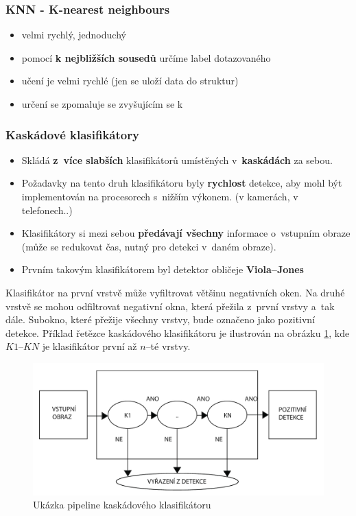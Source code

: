 \subsubsection{KNN - K-nearest neighbours}
\begin{itemize}
\item velmi rychlý, jednoduchý
\item pomocí \textbf{k nejbližších sousedů} určíme label dotazovaného 
\item učení je velmi rychlé (jen se uloží data do struktur)
\item určení se zpomaluje se zvyšujícím se k
\end{itemize}

\subsubsection{Kaskádové klasifikátory} %
\begin{itemize}
  \item Skládá \textbf{z~více slabších} klasifikátorů umístěných v~\textbf{kaskádách} za sebou.
  \item Požadavky na tento druh klasifikátoru byly \textbf{rychlost} detekce, aby mohl být implementován na procesorech s~nižším výkonem. (v kamerách, v telefonech..)
  \item Klasifikátory si mezi sebou \textbf{předávají všechny} informace o~vstupním obraze (může se redukovat čas, nutný pro detekci v~daném obraze).
  \item Prvním takovým klasifikátorem byl detektor obličeje \textbf{Viola--Jones}
\end{itemize}
Klasifikátor na první vrstvě může vyfiltrovat většinu negativních oken. Na druhé vrstvě se mohou odfiltrovat  negativní okna, která přežila z~první vrstvy a~tak dále. Subokno, které přežije všechny vrstvy, bude označeno jako pozitivní detekce. Příklad řetězce kaskádového klasifikátoru je ilustrován na obrázku \ref{fig:ccpipeline}, kde $K1$--$KN$ je klasifikátor první až $n$--té vrstvy.

\begin{figure}[H]
\centering
\includegraphics[width=.6\linewidth]{assets/9_cascadeClass.pdf}
\caption{Ukázka pipeline kaskádového klasifikátoru}
\label{fig:ccpipeline}
\end{figure}

